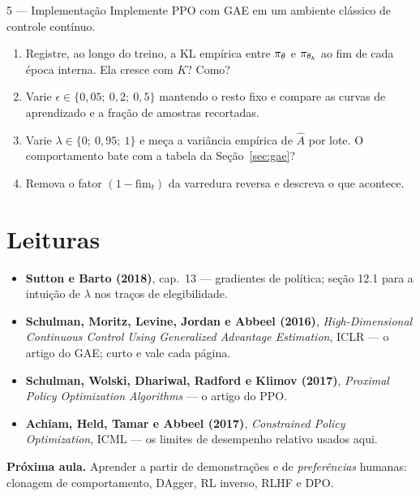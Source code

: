 \documentclass[11pt]{article}
\newcommand{\thv}{\theta}
\newcommand{\thk}{\thv_k}
\newcommand{\polth}{\pol_{\thv}}
\newcommand{\Ahat}{\hat{A}}
\begin{document}
\begin{exbox}{5 --- Implementação}
  Implemente PPO com GAE em um ambiente clássico de controle contínuo.
  \begin{enumerate}
    \item Registre, ao longo do treino, a KL empírica entre $\polth$ e $\pol_{\thk}$ ao
      fim de cada época interna. Ela cresce com $K$? Como?
    \item Varie $\epsilon \in \{0{,}05;\ 0{,}2;\ 0{,}5\}$ mantendo o resto fixo e
      compare as curvas de aprendizado e a fração de amostras recortadas.
    \item Varie $\lambda \in \{0;\ 0{,}95;\ 1\}$ e meça a variância empírica de $\Ahat$
      por lote. O comportamento bate com a tabela da Seção~\ref{sec:gae}?
    \item Remova o fator $(1-\mathrm{fim}_t)$ da varredura reversa e descreva o que
      acontece.
  \end{enumerate}
\end{exbox}

\section*{Leituras}

\begin{itemize}
  \item \textbf{Sutton e Barto (2018)}, cap.\ 13 --- gradientes de política; seção 12.1
    para a intuição de $\lambda$ nos traços de elegibilidade.
  \item \textbf{Schulman, Moritz, Levine, Jordan e Abbeel (2016)},
    \emph{High-Dimensional Continuous Control Using Generalized Advantage Estimation},
    ICLR --- o artigo do GAE; curto e vale cada página.
  \item \textbf{Schulman, Wolski, Dhariwal, Radford e Klimov (2017)},
    \emph{Proximal Policy Optimization Algorithms} --- o artigo do PPO.
  \item \textbf{Achiam, Held, Tamar e Abbeel (2017)},
    \emph{Constrained Policy Optimization}, ICML --- os limites de desempenho relativo
    usados aqui.
\end{itemize}

\vspace{0.6em}
\begin{ideiabox}
  \textbf{Próxima aula.} Aprender a partir de demonstrações e de \emph{preferências}
  humanas: clonagem de comportamento, DAgger, RL inverso, RLHF e DPO.
\end{ideiabox}
\end{document}
